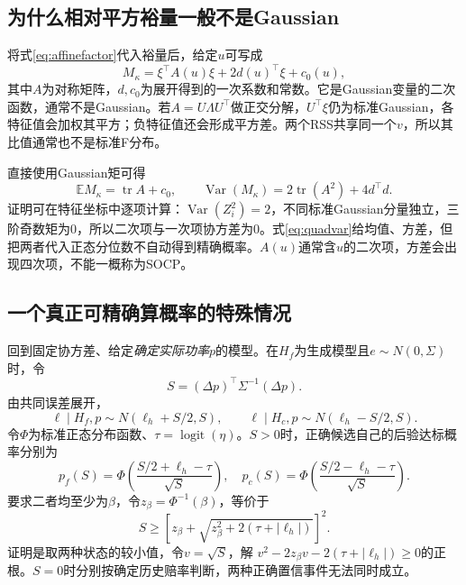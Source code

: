 \documentclass[UTF8,11pt,a4paper,fontset=fandol]{ctexart}
\newcommand{\E}{\mathbb E}
\newcommand{\Var}{\operatorname{Var}}
\newcommand{\tr}{\operatorname{tr}}
\newcommand{\logit}{\operatorname{logit}}
\numberwithin{equation}{section}
\begin{document}
\subsection{为什么相对平方裕量一般不是Gaussian}
将式\eqref{eq:affinefactor}代入裕量后，给定$u$可写成
\begin{equation}
M_\kappa=\xi^\top A(u)\xi+2d(u)^\top\xi+c_0(u),
\label{eq:randomquad}
\end{equation}
其中$A$为对称矩阵，$d,c_0$为展开得到的一次系数和常数。它是Gaussian变量的二次函数，通常不是Gaussian。若$A=U\Lambda U^\top$做正交分解，$U^\top\xi$仍为标准Gaussian，各特征值会加权其平方；负特征值还会形成平方差。两个RSS共享同一个$v$，所以其比值通常也不是标准F分布。

直接使用Gaussian矩可得
\begin{equation}
\E M_\kappa=\tr A+c_0,\qquad
\Var(M_\kappa)=2\tr(A^2)+4d^\top d.
\label{eq:quadvar}
\end{equation}
证明可在特征坐标中逐项计算：$\Var(Z_i^2)=2$，不同标准Gaussian分量独立，三阶奇数矩为0，所以二次项与一次项协方差为0。式\eqref{eq:quadvar}给均值、方差，但把两者代入正态分位数不自动得到精确概率。$A(u)$通常含$u$的二次项，方差会出现四次项，不能一概称为SOCP。

\subsection{一个真正可精确算概率的特殊情况}
回到固定协方差、给定\emph{确定实际功率}$p$的模型。在$H_f$为生成模型且$e\sim N(0,\Sigma)$时，令
\begin{equation}
S=(\Delta p)^\top\Sigma^{-1}(\Delta p).
\end{equation}
由共同误差展开，
\begin{equation}
\ell\mid H_f,p\sim N(\ell_h+S/2,S),\qquad
\ell\mid H_c,p\sim N(\ell_h-S/2,S).
\end{equation}
令$\Phi$为标准正态分布函数、$\tau=\logit(\eta)$。$S>0$时，正确候选自己的后验达标概率分别为
\begin{equation}
p_f(S)=\Phi\!\left(\frac{S/2+\ell_h-\tau}{\sqrt S}\right),\quad
p_c(S)=\Phi\!\left(\frac{S/2-\ell_h-\tau}{\sqrt S}\right).
\end{equation}
要求二者均至少为$\beta$，令$z_\beta=\Phi^{-1}(\beta)$，等价于
\begin{equation}
\boxed{S\ge
\left[z_\beta+\sqrt{z_\beta^2+2(\tau+|\ell_h|)}\right]^2.}
\label{eq:nominal}
\end{equation}
证明是取两种状态的较小值，令$v=\sqrt S$，解
$v^2-2z_\beta v-2(\tau+|\ell_h|)\ge0$的正根。$S=0$时分别按确定历史赔率判断，两种正确置信事件无法同时成立。
\end{document}
